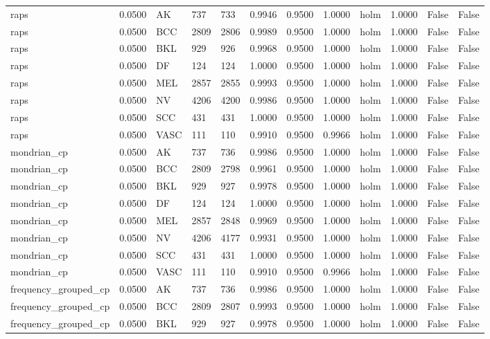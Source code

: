 \begin{table}[htbp]
\begin{tabular}{llllllllllll}
raps & 0.0500 & AK & 737 & 733 & 0.9946 & 0.9500 & 1.0000 & holm & 1.0000 & False & False \\
raps & 0.0500 & BCC & 2809 & 2806 & 0.9989 & 0.9500 & 1.0000 & holm & 1.0000 & False & False \\
raps & 0.0500 & BKL & 929 & 926 & 0.9968 & 0.9500 & 1.0000 & holm & 1.0000 & False & False \\
raps & 0.0500 & DF & 124 & 124 & 1.0000 & 0.9500 & 1.0000 & holm & 1.0000 & False & False \\
raps & 0.0500 & MEL & 2857 & 2855 & 0.9993 & 0.9500 & 1.0000 & holm & 1.0000 & False & False \\
raps & 0.0500 & NV & 4206 & 4200 & 0.9986 & 0.9500 & 1.0000 & holm & 1.0000 & False & False \\
raps & 0.0500 & SCC & 431 & 431 & 1.0000 & 0.9500 & 1.0000 & holm & 1.0000 & False & False \\
raps & 0.0500 & VASC & 111 & 110 & 0.9910 & 0.9500 & 0.9966 & holm & 1.0000 & False & False \\
mondrian\_cp & 0.0500 & AK & 737 & 736 & 0.9986 & 0.9500 & 1.0000 & holm & 1.0000 & False & False \\
mondrian\_cp & 0.0500 & BCC & 2809 & 2798 & 0.9961 & 0.9500 & 1.0000 & holm & 1.0000 & False & False \\
mondrian\_cp & 0.0500 & BKL & 929 & 927 & 0.9978 & 0.9500 & 1.0000 & holm & 1.0000 & False & False \\
mondrian\_cp & 0.0500 & DF & 124 & 124 & 1.0000 & 0.9500 & 1.0000 & holm & 1.0000 & False & False \\
mondrian\_cp & 0.0500 & MEL & 2857 & 2848 & 0.9969 & 0.9500 & 1.0000 & holm & 1.0000 & False & False \\
mondrian\_cp & 0.0500 & NV & 4206 & 4177 & 0.9931 & 0.9500 & 1.0000 & holm & 1.0000 & False & False \\
mondrian\_cp & 0.0500 & SCC & 431 & 431 & 1.0000 & 0.9500 & 1.0000 & holm & 1.0000 & False & False \\
mondrian\_cp & 0.0500 & VASC & 111 & 110 & 0.9910 & 0.9500 & 0.9966 & holm & 1.0000 & False & False \\
frequency\_grouped\_cp & 0.0500 & AK & 737 & 736 & 0.9986 & 0.9500 & 1.0000 & holm & 1.0000 & False & False \\
frequency\_grouped\_cp & 0.0500 & BCC & 2809 & 2807 & 0.9993 & 0.9500 & 1.0000 & holm & 1.0000 & False & False \\
frequency\_grouped\_cp & 0.0500 & BKL & 929 & 927 & 0.9978 & 0.9500 & 1.0000 & holm & 1.0000 & False & False \\

\end{tabular}
\end{table}
